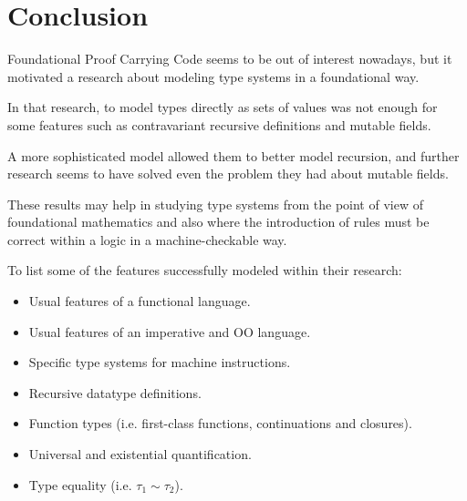 \documentclass{article}
\begin{document}
\section*{Conclusion}

Foundational Proof Carrying Code seems to be out of interest 
nowadays, but it motivated a research about modeling type systems 
in a foundational way.

In that research, to model types directly as sets of values was
not enough for some features such as contravariant recursive
definitions and mutable fields.

A more sophisticated model allowed them to better model recursion, 
and further research seems to have solved even the problem they 
had about mutable fields.

These results may help in studying type systems from the point of 
view of foundational mathematics and also where the introduction 
of rules must be correct within a logic in a machine-checkable 
way.

To list some of the features successfully modeled within 
their research:

\begin{itemize}
  \item Usual features of a functional language.
  \item Usual features of an imperative and OO language.
  \item Specific type systems for machine instructions.
  \item Recursive datatype definitions.
  \item Function types (i.e. first-class functions, continuations 
    and closures).
  \item Universal and existential quantification.
  \item Type equality (i.e. $\tau_1 \sim \tau_2$).
\end{itemize}


{}

\end{document}
